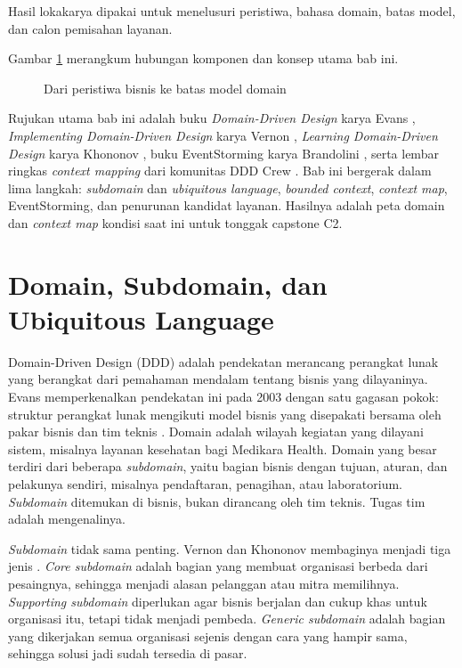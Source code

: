   Hasil lokakarya dipakai untuk menelusuri peristiwa, bahasa domain,
batas model, dan calon pemisahan layanan.

  Gambar \ref{fig:ch06-lokakarya} merangkum hubungan komponen dan konsep utama bab ini.
\begin{figure}[!htb]
  \centering
  
  \caption{Dari peristiwa bisnis ke batas model domain}
  \label{fig:ch06-lokakarya}
\end{figure}

Rujukan utama bab ini adalah buku \textit{Domain-Driven Design} karya Evans \cite{evans2003},
\textit{Implementing Domain-Driven Design} karya Vernon \cite{vernon2013}, \textit{Learning
Domain-Driven Design} karya Khononov \cite{c06-khononov2021}, buku EventStorming karya Brandolini
\cite{c06-brandolini2021}, serta lembar ringkas \textit{context mapping} dari komunitas DDD Crew
\cite{c06-dddcrew-contextmap}. Bab ini bergerak dalam lima langkah: \textit{subdomain} dan
\textit{ubiquitous language}, \textit{bounded context}, \textit{context map}, EventStorming, dan
penurunan kandidat layanan. Hasilnya adalah peta domain dan \textit{context map} kondisi saat ini
untuk tonggak capstone C2.

\section{Domain, Subdomain, dan Ubiquitous Language}
\label{sec:ch06-subdomain}

Domain-Driven Design (DDD) adalah pendekatan merancang perangkat lunak yang berangkat dari
pemahaman mendalam tentang bisnis yang dilayaninya. Evans memperkenalkan pendekatan ini pada 2003
dengan satu gagasan pokok: struktur perangkat lunak mengikuti model bisnis yang disepakati bersama
oleh pakar bisnis dan tim teknis \cite{evans2003}. Domain adalah wilayah kegiatan yang dilayani
sistem, misalnya layanan kesehatan bagi Medikara Health. Domain yang besar terdiri dari beberapa
\textit{subdomain}, yaitu bagian bisnis dengan tujuan, aturan, dan pelakunya sendiri, misalnya
pendaftaran, penagihan, atau laboratorium. \textit{Subdomain} ditemukan di bisnis, bukan dirancang
oleh tim teknis. Tugas tim adalah mengenalinya.

\textit{Subdomain} tidak sama penting. Vernon dan Khononov membaginya menjadi tiga jenis
\cite{vernon2013,c06-khononov2021}. \textit{Core subdomain} adalah bagian yang membuat organisasi
berbeda dari pesaingnya, sehingga menjadi alasan pelanggan atau mitra memilihnya.
\textit{Supporting subdomain} diperlukan agar bisnis berjalan dan cukup khas untuk organisasi itu,
tetapi tidak menjadi pembeda. \textit{Generic subdomain} adalah bagian yang dikerjakan semua
organisasi sejenis dengan cara yang hampir sama, sehingga solusi jadi sudah tersedia di pasar.

